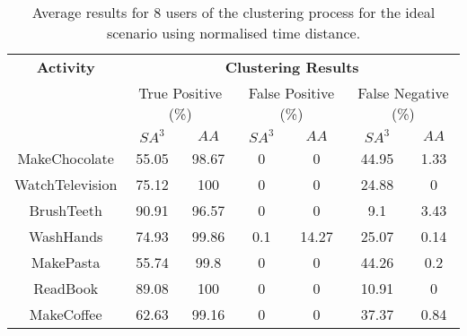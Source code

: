 \begin{table}[htbp]\scriptsize
  \begin{center}
        \begin{tabular}{ccccccc}
            \hline            
            \textbf{Activity} & \multicolumn{6}{c}{\textbf{Clustering Results}} \\
             & \multicolumn{2}{c}{True Positive (\%)} & \multicolumn{2}{c}{False Positive (\%)} & \multicolumn{2}{c}{False Negative (\%)} \\
             & $SA^3$ & $AA$ & $SA^3$ & $AA$ & $SA^3$ & $AA$ \\
            \hline
            MakeChocolate   & 55.05 & 98.67 & 0    & 0    & 44.95 & 1.33 \\
	    WatchTelevision & 75.12 & 100   & 0    & 0    & 24.88 & 0    \\
	    BrushTeeth      & 90.91 & 96.57 & 0    & 0    & 9.1   & 3.43 \\
	    WashHands       & 74.93 & 99.86 & 0.1  & 14.27 & 25.07 & 0.14 \\
	    MakePasta       & 55.74 & 99.8  & 0    & 0    & 44.26 & 0.2 \\
	    ReadBook        & 89.08 & 100   & 0    & 0    & 10.91 & 0 \\
	    MakeCoffee      & 62.63 & 99.16 & 0    & 0    & 37.37 & 0.84 \\
            \hline
        \end{tabular}
        \caption{Average results for 8 users of the clustering process for the ideal scenario using normalised time distance.}
        \label{tab-r-ideal-t2}
        \end{center}
\end{table}

